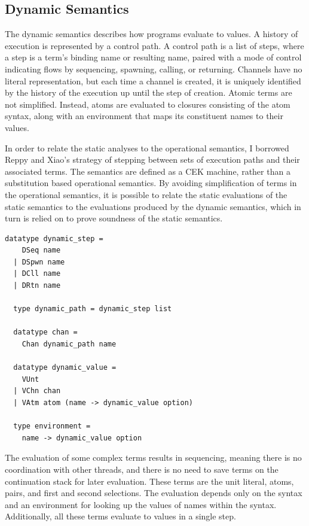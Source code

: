 \documentclass[letterpaper, 11pt]{extarticle}
\begin{document}
\subsection{Dynamic Semantics}
The dynamic semantics describes how programs evaluate to values.
A history of execution is represented by a control path.
A control path is a list of steps, where a step is a term's 
binding name or resulting name, paired with a mode of control indicating
flows by sequencing, spawning, calling, or returning.
Channels have no literal representation, but each
time a channel is created, it is uniquely identified by the history of the execution up until
the step of creation. Atomic terms are not simplified. Instead, atoms are evaluated to
closures consisting of the atom syntax, along with an environment that maps its
constituent names to their values.

In order to relate the static analyses to the operational semantics, I
borrowed Reppy and Xiao's strategy of stepping between sets of execution paths and
their associated terms.
The semantics are defined as a CEK machine, rather than a
substitution based operational semantics. By avoiding simplification of terms in the
operational semantics, it is possible to relate
the static evaluations of the static semantics to the
evaluations produced by the dynamic semantics,
which in turn is relied on to prove soundness of the static semantics.


\begin{lstlisting}[language=logic]
  datatype dynamic_step =
    DSeq name
  | DSpwn name
  | DCll name
  | DRtn name 

  type dynamic_path = dynamic_step list

  datatype chan =
    Chan dynamic_path name 

  datatype dynamic_value = 
    VUnt
  | VChn chan
  | VAtm atom (name -> dynamic_value option)

  type environment =
    name -> dynamic_value option
\end{lstlisting}

The evaluation of some complex terms results in sequencing, meaning there is no coordination
with other threads, and there is no need to save terms on
the continuation stack for later evaluation. These terms are the
unit literal, atoms, pairs, and first and second selections. The evaluation depends only
on the syntax and an environment for looking up the values of names within the syntax.
Additionally, all these terms evaluate to values in a single step.
\end{document}
